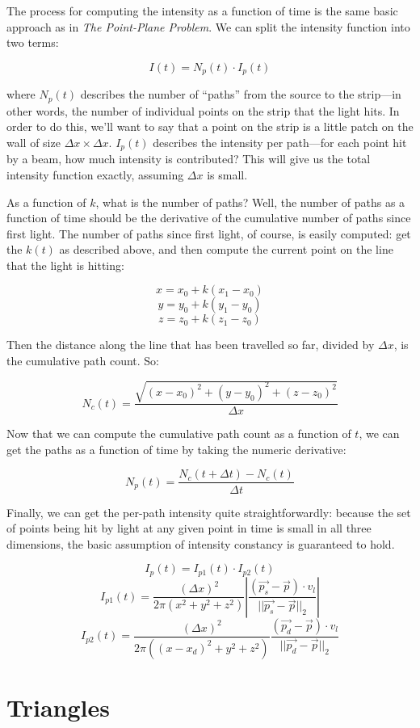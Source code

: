 \documentclass[11pt]{article}
\begin{document}
The process for computing the intensity as a function of time is the same basic approach as in \emph{The Point-Plane Problem}. We can split the intensity function into two terms:

$$I(t) = N_p(t) \cdot I_p(t)$$

where $N_p(t)$ describes the number of ``paths'' from the source to the strip---in other words, the number of individual points on the strip that the light hits. In order to do this, we'll want to say that a point on the strip is a little patch on the wall of size $\Delta x \times \Delta x$. $I_p(t)$ describes the intensity per path---for each point hit by a beam, how much intensity is contributed? This will give us the total intensity function exactly, assuming $\Delta x$ is small.

As a function of $k$, what is the number of paths? Well, the number of paths as a function of time should be the derivative of the cumulative number of paths since first light. The number of paths since first light, of course, is easily computed: get the $k(t)$ as described above, and then compute the current point on the line that the light is hitting:

$$x = x_0 + k(x_1 - x_0)$$
$$y = y_0 + k(y_1 - y_0)$$
$$z = z_0 + k(z_1 - z_0)$$

Then the distance along the line that has been travelled so far, divided by $\Delta x$, is the cumulative path count. So:

$$N_c(t) = \frac{\sqrt{(x-x_0)^2 + (y-y_0)^2 + (z-z_0)^2}}{\Delta x}$$

Now that we can compute the cumulative path count as a function of $t$, we can get the paths as a function of time by taking the numeric derivative:

$$N_p(t) = \frac{N_c(t + \Delta t) - N_c(t)}{\Delta t}$$

Finally, we can get the per-path intensity quite straightforwardly: because the set of points being hit by light at any given point in time is small in all three dimensions, the basic assumption of intensity constancy is guaranteed to hold. 

$$I_p(t) = I_{p1}(t) \cdot I_{p2}(t)$$
$$I_{p1}(t) = \frac{(\Delta x)^2}{2\pi(x^2+y^2+z^2)} |\frac{(\vec{p_s} - \vec{p}) \cdot v_l}{||\vec{p_s} - \vec{p}||_2}|$$
$$I_{p2}(t) = \frac{(\Delta x)^2}{2\pi((x-x_d)^2+y^2+z^2)} \frac{(\vec{p_d} - \vec{p}) \cdot v_l}{||\vec{p_d} - \vec{p}||_2}$$

\section{Triangles}
\end{document}

